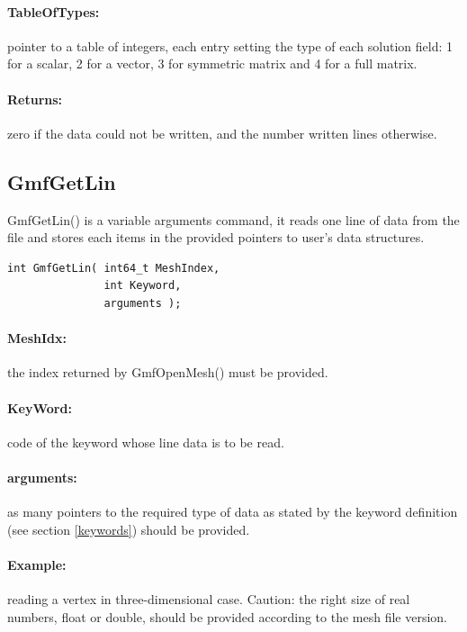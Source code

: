 \documentclass[a4paper,12pt]{article}
\begin{document}
\paragraph{TableOfTypes:} pointer to a table of integers, each entry setting the type of each solution field: 1 for a scalar, 2 for a vector, 3 for symmetric matrix and 4 for a full matrix.

\paragraph{Returns:} zero if the data could not be written, and the number written lines otherwise.


\subsection{GmfGetLin}
GmfGetLin() is a variable arguments command, it reads one line of data from the file and stores each items in the provided pointers to user's data structures.

\begin{tt}
\begin{verbatim}
int GmfGetLin( int64_t MeshIndex,
               int Keyword,
               arguments );
\end{verbatim}
\end{tt}
\normalfont

\paragraph{MeshIdx:}
the index returned by GmfOpenMesh() must be provided.

\paragraph{KeyWord:} code of the keyword whose line data is to be read.

\paragraph{arguments:} as many pointers to the required type of data as stated by the keyword definition (see section \ref{keywords}) should be provided.

\paragraph{Example:} reading a vertex in three-dimensional case. Caution: the right size of real numbers, float or double, should be provided according to the mesh file version.
\end{document}
